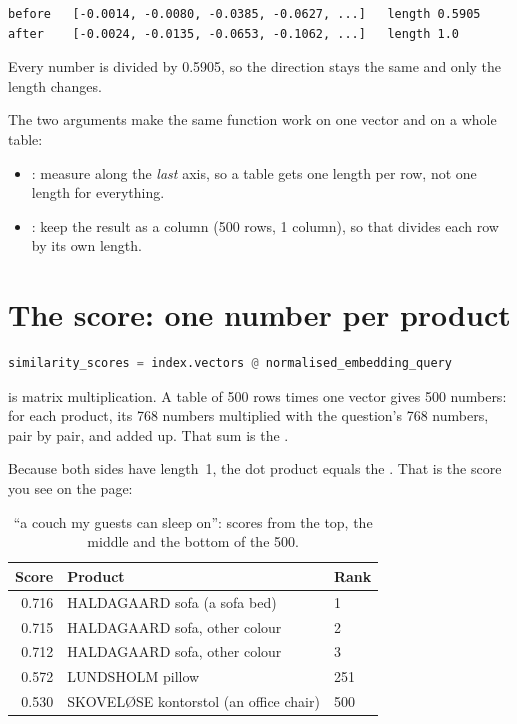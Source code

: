 \documentclass[11pt]{article}
\begin{document}
\begin{lstlisting}
before   [-0.0014, -0.0080, -0.0385, -0.0627, ...]   length 0.5905
after    [-0.0024, -0.0135, -0.0653, -0.1062, ...]   length 1.0
\end{lstlisting}
Every number is divided by 0.5905, so the direction stays the same and
only the length changes.

The two arguments make the same function work on one vector and on a
whole table:
\begin{itemize}[leftmargin=1.4em, itemsep=2pt]
\item {}: measure along the \emph{last} axis, so a table
  gets one length per row, not one length for everything.
\item {}: keep the result as a column (500 rows, 1
  column), so that  divides each row by its
  own length.
\end{itemize}

\section{The score: one number per product}
\label{sec:score}

\begin{lstlisting}[language=Python]
similarity_scores = index.vectors @ normalised_embedding_query
\end{lstlisting}

 is matrix multiplication. A table of 500 rows times one vector
gives 500 numbers: for each product, its 768 numbers multiplied with
the question's 768 numbers, pair by pair, and added up. That sum is
the .

Because both sides have length~1, the dot product equals the
. That is the score you
see on the page:

\begin{table}[H]
\small
\begin{tabularx}{\textwidth}{@{}r X l@{}}
\toprule
Score & Product & Rank \\
\midrule
0.716 & HALDAGAARD sofa (a sofa bed) & 1 \\
0.715 & HALDAGAARD sofa, other colour & 2 \\
0.712 & HALDAGAARD sofa, other colour & 3 \\
0.572 & LUNDSHOLM pillow & 251 \\
0.530 & SKOVELØSE kontorstol (an office chair) & 500 \\
\bottomrule
\end{tabularx}
\caption{``a couch my guests can sleep on'': scores from the top, the
middle and the bottom of the 500.}
\end{table}
\end{document}
